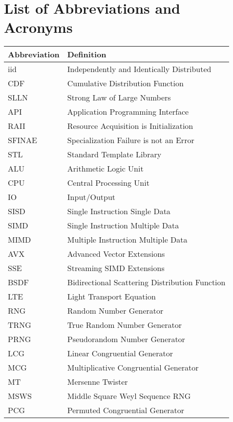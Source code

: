\documentclass{stdlocal}
\begin{document}
  \section*{List of Abbreviations and Acronyms}

  \begin{table}[H]
    \center
    \renewcommand{\arraystretch}{1.3}
    \begin{tabularx}{\textwidth}{lX}
      \hline
      \textbf{Abbreviation} & \textbf{Definition} \\
      \hline
      \hline
      iid & Independently and Identically Distributed \\
      CDF & Cumulative Distribution Function \\
      SLLN & Strong Law of Large Numbers \\
      \hline
      API & Application Programming Interface \\
      RAII & Resource Acquisition is Initialization \\
      SFINAE & Specialization Failure is not an Error \\
      STL & Standard Template Library \\
      \hline
      ALU & Arithmetic Logic Unit \\
      CPU & Central Processing Unit \\
      IO & Input/Output \\
      SISD & Single Instruction Single Data \\
      SIMD & Single Instruction Multiple Data \\
      MIMD & Multiple Instruction Multiple Data \\
      AVX & Advanced Vector Extensions \\
      SSE & Streaming SIMD Extensions \\
      \hline
      BSDF & Bidirectional Scattering Distribution Function \\
      LTE & Light Transport Equation \\
      \hline
      RNG & Random Number Generator \\
      TRNG & True Random Number Generator \\
      PRNG & Pseudorandom Number Generator \\
      LCG & Linear Congruential Generator \\
      MCG & Multiplicative Congruential Generator \\
      MT & Mersenne Twister \\
      MSWS & Middle Square Weyl Sequence RNG \\
      PCG & Permuted Congruential Generator \\
      \hline
    \end{tabularx}
  \end{table}
\end{document}
